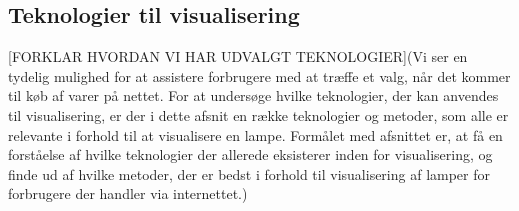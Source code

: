 




\subsection{Teknologier til visualisering}
[FORKLAR HVORDAN VI HAR UDVALGT TEKNOLOGIER](Vi ser en tydelig mulighed for at assistere forbrugere med at træffe et valg, når det kommer til køb af varer på nettet. For at undersøge hvilke teknologier, der kan anvendes til visualisering, er der i dette afsnit en række teknologier og metoder, som alle er relevante i forhold til at visualisere en lampe. Formålet med afsnittet er, at få en forståelse af hvilke teknologier der allerede eksisterer inden for visualisering, og finde ud af hvilke metoder, der er bedst i forhold til visualisering af lamper for forbrugere der handler via internettet.)

